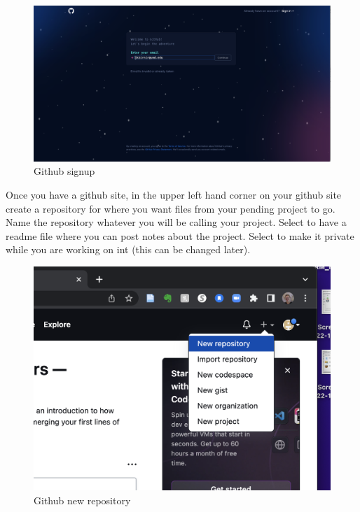 \documentclass[
  letterpaper,
  DIV=11,
  numbers=noendperiod]{scrartcl}
\begin{document}
\begin{figure}

{\centering \includegraphics{figures/2.PNG}

}

\caption{Github signup}

\end{figure}

Once you have a github site, in the upper left hand corner on your
github site create a repository for where you want files from your
pending project to go. Name the repository whatever you will be calling
your project. Select to have a readme file where you can post notes
about the project. Select to make it private while you are working on
int (this can be changed later).

\begin{figure}

{\centering \includegraphics{figures/3.PNG}

}

\caption{Github new repository}

\end{figure}
\end{document}
